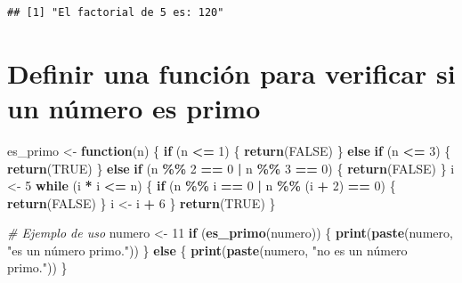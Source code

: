 \documentclass[
]{book}
\newenvironment{Shaded}{\begin{snugshade}}{\end{snugshade}}
\newcommand{\CommentTok}[1]{\textcolor[rgb]{0.56,0.35,0.01}{\textit{#1}}}
\newcommand{\ConstantTok}[1]{\textcolor[rgb]{0.56,0.35,0.01}{#1}}
\newcommand{\ControlFlowTok}[1]{\textcolor[rgb]{0.13,0.29,0.53}{\textbf{#1}}}
\newcommand{\DecValTok}[1]{\textcolor[rgb]{0.00,0.00,0.81}{#1}}
\newcommand{\FunctionTok}[1]{\textcolor[rgb]{0.13,0.29,0.53}{\textbf{#1}}}
\newcommand{\NormalTok}[1]{#1}
\newcommand{\OtherTok}[1]{\textcolor[rgb]{0.56,0.35,0.01}{#1}}
\newcommand{\SpecialCharTok}[1]{\textcolor[rgb]{0.81,0.36,0.00}{\textbf{#1}}}
\newcommand{\StringTok}[1]{\textcolor[rgb]{0.31,0.60,0.02}{#1}}
\begin{document}
\begin{verbatim}
## [1] "El factorial de 5 es: 120"
\end{verbatim}

\hypertarget{definir-una-funciuxf3n-para-verificar-si-un-nuxfamero-es-primo}{%
\section{Definir una función para verificar si un número es primo}\label{definir-una-funciuxf3n-para-verificar-si-un-nuxfamero-es-primo}}

\begin{Shaded}
\begin{Highlighting}[]
\NormalTok{es\_primo }\OtherTok{\textless{}{-}} \ControlFlowTok{function}\NormalTok{(n) \{}
  \ControlFlowTok{if}\NormalTok{ (n }\SpecialCharTok{\textless{}=} \DecValTok{1}\NormalTok{) \{}
    \FunctionTok{return}\NormalTok{(}\ConstantTok{FALSE}\NormalTok{)}
\NormalTok{  \} }\ControlFlowTok{else} \ControlFlowTok{if}\NormalTok{ (n }\SpecialCharTok{\textless{}=} \DecValTok{3}\NormalTok{) \{}
    \FunctionTok{return}\NormalTok{(}\ConstantTok{TRUE}\NormalTok{)}
\NormalTok{  \} }\ControlFlowTok{else} \ControlFlowTok{if}\NormalTok{ (n }\SpecialCharTok{\%\%} \DecValTok{2} \SpecialCharTok{==} \DecValTok{0} \SpecialCharTok{|}\NormalTok{ n }\SpecialCharTok{\%\%} \DecValTok{3} \SpecialCharTok{==} \DecValTok{0}\NormalTok{) \{}
    \FunctionTok{return}\NormalTok{(}\ConstantTok{FALSE}\NormalTok{)}
\NormalTok{  \}}
\NormalTok{  i }\OtherTok{\textless{}{-}} \DecValTok{5}
  \ControlFlowTok{while}\NormalTok{ (i }\SpecialCharTok{*}\NormalTok{ i }\SpecialCharTok{\textless{}=}\NormalTok{ n) \{}
    \ControlFlowTok{if}\NormalTok{ (n }\SpecialCharTok{\%\%}\NormalTok{ i }\SpecialCharTok{==} \DecValTok{0} \SpecialCharTok{|}\NormalTok{ n }\SpecialCharTok{\%\%}\NormalTok{ (i }\SpecialCharTok{+} \DecValTok{2}\NormalTok{) }\SpecialCharTok{==} \DecValTok{0}\NormalTok{) \{}
      \FunctionTok{return}\NormalTok{(}\ConstantTok{FALSE}\NormalTok{)}
\NormalTok{    \}}
\NormalTok{    i }\OtherTok{\textless{}{-}}\NormalTok{ i }\SpecialCharTok{+} \DecValTok{6}
\NormalTok{  \}}
  \FunctionTok{return}\NormalTok{(}\ConstantTok{TRUE}\NormalTok{)}
\NormalTok{\}}

\CommentTok{\# Ejemplo de uso}
\NormalTok{numero }\OtherTok{\textless{}{-}} \DecValTok{11}
\ControlFlowTok{if}\NormalTok{ (}\FunctionTok{es\_primo}\NormalTok{(numero)) \{}
  \FunctionTok{print}\NormalTok{(}\FunctionTok{paste}\NormalTok{(numero, }\StringTok{"es un número primo."}\NormalTok{))}
\NormalTok{\} }\ControlFlowTok{else}\NormalTok{ \{}
  \FunctionTok{print}\NormalTok{(}\FunctionTok{paste}\NormalTok{(numero, }\StringTok{"no es un número primo."}\NormalTok{))}
\NormalTok{\}}
\end{Highlighting}
\end{Shaded}
\end{document}
